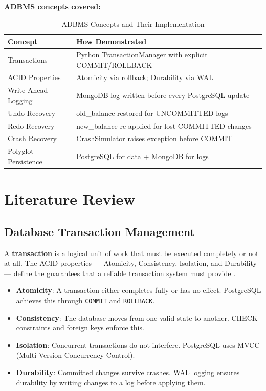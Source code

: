 \noindent\textbf{ADBMS concepts covered:}

\begin{table}[H]
\centering
\caption{ADBMS Concepts and Their Implementation}
\begin{tabularx}{\textwidth}{lX}
\toprule
\textbf{Concept} & \textbf{How Demonstrated} \\
\midrule
Transactions & Python TransactionManager with explicit COMMIT/ROLLBACK \\
ACID Properties & Atomicity via rollback; Durability via WAL \\
Write-Ahead Logging & MongoDB log written before every PostgreSQL update \\
Undo Recovery & old\_balance restored for UNCOMMITTED logs \\
Redo Recovery & new\_balance re-applied for lost COMMITTED changes \\
Crash Recovery & CrashSimulator raises exception before COMMIT \\
Polyglot Persistence & PostgreSQL for data + MongoDB for logs \\
\bottomrule
\end{tabularx}
\end{table}

\chapter{Literature Review}

\section{Database Transaction Management}

A \textbf{transaction} is a logical unit of work that must be executed
completely or not at all. The ACID properties --- Atomicity, Consistency,
Isolation, and Durability --- define the guarantees that a reliable
transaction system must provide \cite{ramakrishnan2002}.

\begin{itemize}
  \item \textbf{Atomicity}: A transaction either completes fully or has
        no effect. PostgreSQL achieves this through \texttt{COMMIT} and
        \texttt{ROLLBACK}.
  \item \textbf{Consistency}: The database moves from one valid state to
        another. CHECK constraints and foreign keys enforce this.
  \item \textbf{Isolation}: Concurrent transactions do not interfere.
        PostgreSQL uses MVCC (Multi-Version Concurrency Control).
  \item \textbf{Durability}: Committed changes survive crashes. WAL logging
        ensures durability by writing changes to a log before applying them.
\end{itemize}

